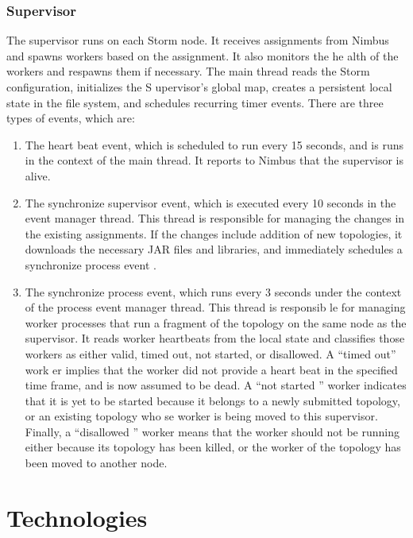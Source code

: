 \documentclass[9pt,twocolumn,twoside]{../../styles/osajnl}
\begin{document}
\subsubsection{Supervisor}


The supervisor runs on each Storm node. It receives assignments from
Nimbus and spawns workers based on the assignment. It also monitors
the he alth of the workers and respawns them if necessary. The main
thread reads the Storm configuration, initializes the S upervisor’s
global map, creates a persistent local state in the file system, and
schedules recurring timer events. There are three types of events,
which are:

\begin{enumerate}
\item The heart beat event, which is scheduled to run every 15
  seconds, and is runs in the context of the main thread. It reports
  to Nimbus that the supervisor is alive.
\item The synchronize supervisor event, which is executed every 10
  seconds in the event manager thread. This thread is responsible for
  managing the changes in the existing assignments. If the changes
  include addition of new topologies, it downloads the necessary JAR
  files and libraries, and immediately schedules a synchronize process
  event .
\item The synchronize process event, which runs every 3 seconds under
  the context of the process event manager thread. This thread is
  responsib le for managing worker processes that run a fragment of
  the topology on the same node as the supervisor. It reads worker
  heartbeats from the local state and classifies those workers as
  either valid, timed out, not started, or disallowed. A “timed out”
  work er implies that the worker did not provide a heart beat in the
  specified time frame, and is now assumed to be dead. A “not started
  ” worker indicates that it is yet to be started because it belongs
  to a newly submitted topology, or an existing topology who se worker
  is being moved to this supervisor. Finally, a “disallowed ” worker
  means that the worker should not be running either because its
  topology has been killed, or the worker of the topology has been
  moved to another node.\\
\end{enumerate}




\enlargethispage{-\baselineskip}
\section{Technologies}
\end{document}

